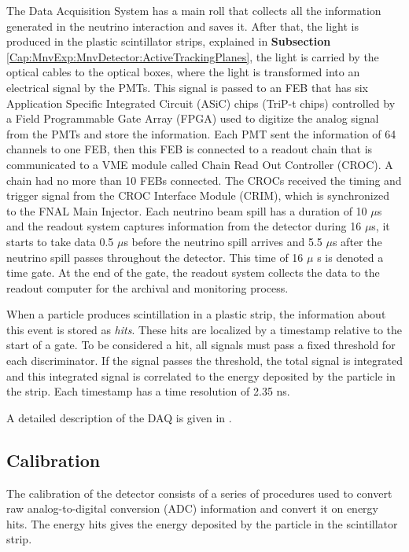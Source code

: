 The Data Acquisition System has a main roll that collects all the information generated in the neutrino interaction and saves it. After that, the light is produced in the plastic scintillator strips, explained in \textbf{Subsection} \ref{Cap:MnvExp:MnvDetector:ActiveTrackingPlanes}, the light is carried by the optical cables to the optical boxes, where the light is transformed into an electrical signal by the PMTs. This signal is passed to an FEB that has six Application Specific Integrated Circuit (ASiC) chips (TriP-t chips)\cite{osti_1012682} controlled by a Field Programmable Gate Array (FPGA) used to digitize the analog signal from the PMTs and store the information. Each PMT sent the information of 64 channels to one FEB, then this FEB is connected to a readout chain that is communicated to a VME\cite{VMEModule} module called Chain Read Out Controller (CROC). A chain had no more than 10 FEBs connected. The CROCs received the timing and trigger signal from the CROC Interface Module (CRIM), which is synchronized to the FNAL Main Injector. Each neutrino beam spill has a duration of 10 $\mu$s and the readout system captures information from the detector during 16 $\mu$s, it starts to take data 0.5 $\mu$s before the neutrino spill arrives and 5.5 $\mu$s after the neutrino spill passes throughout the detector. This time of 16 $\mu$ s is denoted a time gate. At the end of the gate, the readout system collects the data to the readout computer for the archival and monitoring process.

When a particle produces scintillation in a plastic strip, the information about this event is stored as \textit{hits}. These hits are localized by a timestamp relative to the start of a gate. To be considered a hit, all signals must pass a fixed threshold for each discriminator. If the signal passes the threshold, the total signal is integrated and this integrated signal is correlated to the energy deposited by the particle in the strip. Each timestamp has a time resolution of 2.35 ns. 

A detailed description of the DAQ is given in \cite{DAQPERDUE2012179}.

\subsection{Calibration}
\label{Cap:MnvExp:MnvDetector:Calibration}

The calibration of the detector consists of a series of procedures used to convert raw analog-to-digital conversion (ADC) information and convert it on energy hits. The energy hits gives the energy deposited by the particle in the scintillator strip. 



